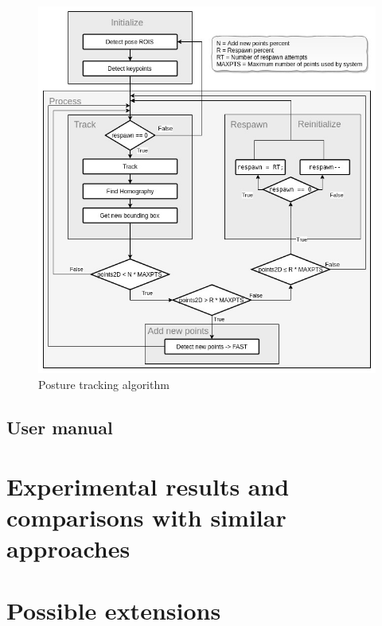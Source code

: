 \begin{figure}
	\centerline{\includegraphics[scale=0.5]{fig/posture-tracking-algorithm.jpg}}  
	\caption{Posture tracking algorithm}
\end{figure}
\subsection{User manual}

\section{Experimental results and comparisons with similar approaches}

\section{Possible extensions}